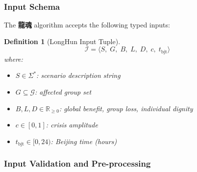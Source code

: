 \documentclass[conference]{IEEEtran}
\newtheorem{definition}{Definition}
\newcommand{\LH}{\textcolor{dragonRed}{\textbf{龍魂}}}
\begin{document}
\subsubsection{Input Schema}

The \LH{} algorithm accepts the following typed inputs:

\begin{definition}[LongHun Input Tuple]
\begin{equation}
  \mathcal{I} = \langle
    S,\; G,\; B,\; L,\; D,\; c,\; t_{\text{bjt}}
  \rangle
  \label{eq:input-tuple}
\end{equation}
where:
\begin{itemize}
  \item $S \in \Sigma^{*}$: scenario description string
  \item $G \subseteq \mathcal{G}$: affected group set
  \item $B, L, D \in \mathbb{R}_{\geq 0}$:
    global benefit, group loss, individual dignity
  \item $c \in [0,1]$: crisis amplitude
  \item $t_{\text{bjt}} \in [0,24)$: Beijing time (hours)
\end{itemize}
\end{definition}

\subsubsection{Input Validation and Pre-processing}
\end{document}
